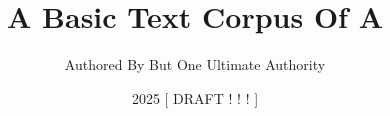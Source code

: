 \title{A Basic Text Corpus Of A}
\author{Authored By But One Ultimate Authority}
\date{2025 [ DRAFT ! ! ! ]}
\newcommand{\logo}{%
    symbol1.png
}

\setstocksize{9in}{6in}%
\settrimmedsize{9in}{6in}{*}
\settrims{0in}{0in}

\setcolsepandrule{0.1875in}{0pt}

\settypeblocksize{*}{5.1125in}{*}  %

\checkandfixthelayout

\newcommand{\bbcontentsname}{%
    \headings Books from a Corpus of A
}

\newcommand{\bbChapterPreamble}{%
    \bbHeading{Chapter-Book Preamble}
        Extract from Alcoholics Anonymous 2nd Ed., 
        $\textcopyright$ AA World Services, Inc., 
        which is in the U.S. public domain.
        The text is used here for transformation into the verse form of a basic text 
        to facillitate verse based study and commentary.
}
